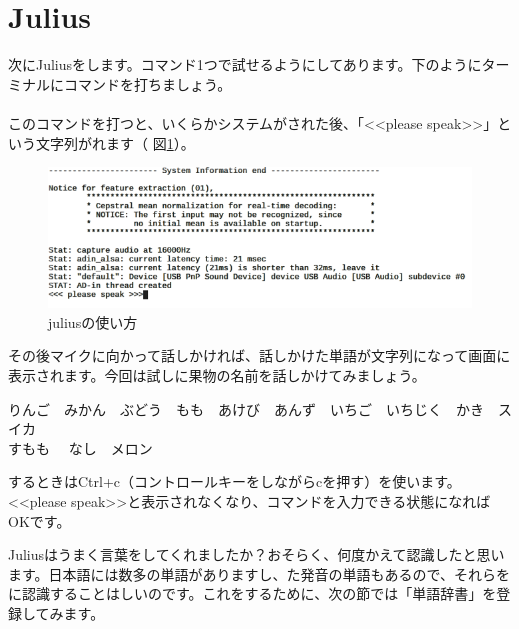 \newpage
\section{Julius}\label{Julius}
次にJuliusをします。コマンド1つで試せるようにしてあります。下のようにターミナルにコマンドを打ちましょう。\\
\\
このコマンドを打つと、いくらかシステムがされた後、「<<please speak>>」という文字列がれます（ 図\ref{juliusの使い方}）。
\begin{figure}[H]
\begin{center}
    \includegraphics[width=.8\linewidth]{images/chap06/text06-img009.png}
    \caption{juliusの使い方}
    \label{juliusの使い方}
\end{center}
\end{figure}
その後マイクに向かって話しかければ、話しかけた単語が文字列になって画面に表示されます。今回は試しに果物の名前を話しかけてみましょう。
\begin{center}
	りんご　みかん　ぶどう　もも　あけび　あんず　いちご　いちじく　かき　スイカ\\すもも　	なし　メロン
\end{center}
するときはCtrl+c（コントロールキーをしながらcを押す）を使います。<<please speak>>と表示されなくなり、コマンドを入力できる状態になればOKです。

Juliusはうまく言葉をしてくれましたか？おそらく、何度かえて認識したと思います。日本語には数多の単語がありますし、た発音の単語もあるので、それらをに認識することはしいのです。これをするために、次の節では「単語辞書」を登録してみます。\\

\begin{tcolorbox}[title=\useOmetoi]
\begin{enumerate}
\end{enumerate}
\end{tcolorbox}
